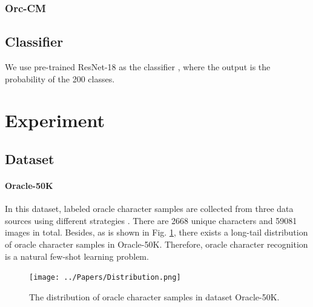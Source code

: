 \documentclass{article}
\begin{document}
\subsubsection{Orc-CM}

\subsection{Classifier}

We use pre-trained ResNet-18 as the classifier \citep{ResNet}, where the output is the probability of the 200 classes.

\section{Experiment}

\subsection{Dataset}

\paragraph{Oracle-50K}
In this dataset, labeled oracle character samples are collected  from three data sources using different strategies \citep{Orc-BERT}. There are 2668 unique characters and 59081 images in total. Besides, as is shown in Fig. \ref{fig:distribution}, there exists a long-tail distribution of oracle character samples in Oracle-50K. Therefore, oracle character recognition is a natural few-shot learning problem.

\begin{figure}[h]
	\centering
	\texttt{[image: ../Papers/Distribution.png]}
	\caption{The distribution of oracle character samples in dataset Oracle-50K.}
	\label{fig:distribution}
\end{figure}
\end{document}
